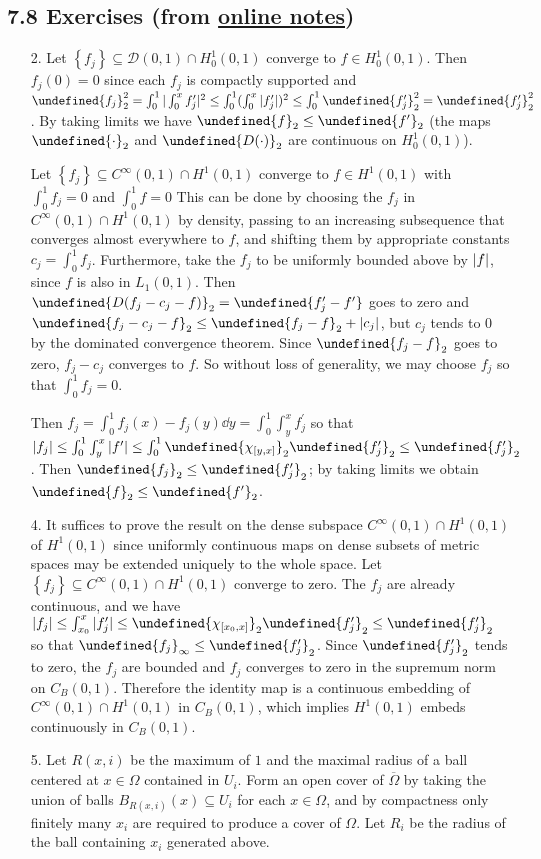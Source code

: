 \documentclass[11pt,leqno]{article}
\theoremstyle{plain}
\theoremstyle{definition}
\numberwithin{equation}{section}
\numberwithin{lem}{section}
\newcommand{\cbr}[1]{\left\{#1\right\}}
\let\norm\undefined %
\DeclarePairedDelimiter\norm{\lVert}{\rVert}
\begin{document}
\subsection*{7.8 Exercises (from \href{https://users.oden.utexas.edu/~arbogast/appMath08c.pdf}{online notes})}
\begin{enumerate}
    \item[2.] Let $\cbr{f_j}\subseteq \mathcal D(0,1)\cap H^1_0(0,1)$ converge to $f\in H^1_0(0,1)$. Then $f_j(0) = 0$ since each $f_j$ is compactly supported and $\norm{f_j}_2^2 = \int_0^1|\int_0^x f_j^\prime|^2\leq \int_0^1(\int_0^x|f_j^\prime|)^2\leq \int_0^1\norm{f_j^\prime}_2^2 = \norm{f_j^\prime}_2^2$. By taking limits we have $\norm{f}_2\leq \norm{f^\prime}_2$ (the maps $\norm{\cdot}_2$ and $\norm{D(\cdot)}_2$ are continuous on $H^1_0(0,1)$).
    
    Let $\cbr{f_j}\subseteq C^\infty(0,1)\cap H^1(0,1)$ converge to $f\in H^1(0,1)$ with $\int_0^1f_j = 0$ and $\int_0^1f = 0$ This can be done by choosing the $f_j$ in $C^\infty(0,1)\cap H^1(0,1)$ by density, passing to an increasing subsequence that converges almost everywhere to $f$, and shifting them by appropriate constants $c_j = \int_0^1 f_j$. Furthermore, take the $f_j$ to be uniformly bounded above by $\abs{f}$, since $f$ is also in $L_1(0,1)$. Then $\norm{D(f_j-c_j-f)}_2 = \norm{f_j^\prime-f^\prime}$ goes to zero and $\norm{f_j-c_j-f}_2\leq \norm{f_j-f}_2 + \abs{c_j}$, but $c_j$ tends to $0$ by the dominated convergence theorem. Since $\norm{f_j-f}_2$ goes to zero, $f_j-c_j$ converges to $f$. So without loss of generality, we may choose $f_j$ so that $\int_0^1 f_j = 0$.
    
    Then $f_j = \int_0^1f_j(x) - f_j(y)\dd y = \int_0^1\int_y^x f_j^\prime$ so that $\abs{f_j} \leq \int_0^1\int_y^x \abs{f^\prime}\leq \int_0^1\norm{\chi_{[y,x]}}_2\norm{f_j^\prime}_2\leq \norm{f_j^\prime}_2$. Then $\norm{f_j}_2 \leq \norm{f_j^\prime}_2$; by taking limits we obtain $\norm{f}_2\leq \norm{f^\prime}_2$.
    \item[4.] It suffices to prove the result on the dense subspace $C^\infty(0,1)\cap H^1(0,1)$ of $H^1(0,1)$ since uniformly continuous maps on dense subsets of metric spaces may be extended uniquely to the whole space. Let $\cbr{f_j}\subseteq C^\infty(0,1)\cap H^1(0,1)$ converge to zero. The $f_j$ are already continuous, and we have $\abs{f_j}\leq \int_{x_0}^x|f_j^\prime|\leq \norm{\chi_{[x_0,x]}}_2\norm{f_j^\prime}_2 \leq \norm{f_j^\prime}_2$ so that $\norm{f_j}_\infty\leq \norm{f_j^\prime}_2$. Since $\norm{f_j^\prime}_2$ tends to zero, the $f_j$ are bounded and $f_j$ converges to zero in the supremum norm on $C_B(0,1)$. Therefore the identity map is a continuous embedding of $C^\infty(0,1)\cap H^1(0,1)$ in $C_B(0,1)$, which implies $H^1(0,1)$ embeds continuously in $C_B(0,1)$.
    \item[5.] Let $R(x,i)$ be the maximum of $1$ and the maximal radius of a ball centered at $x\in \Omega$ contained in $U_i$. Form an open cover of $\overline \Omega$ by taking the union of balls $B_{R(x,i)}(x)\subseteq U_i$ for each $x\in \Omega$, and by compactness only finitely many $x_i$ are required to produce a cover of $\Omega$. Let $R_i$ be the radius of the ball containing $x_i$ generated above.
    

\end{enumerate}
\end{document}
